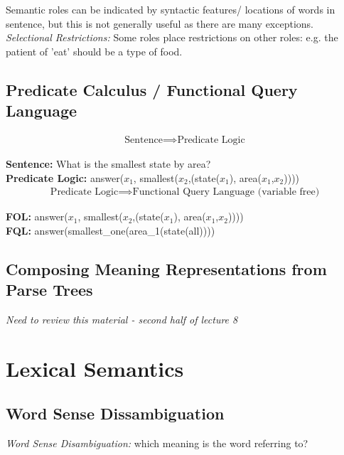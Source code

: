 \documentclass[]{article}
\begin{document}
	Semantic roles can be indicated by syntactic features/ locations of words in sentence, but this is not generally useful as there are many exceptions. \\
	
	\textit{Selectional Restrictions:} Some roles place restrictions on other roles: e.g. the patient of 'eat' should be a type of food.
	
	\subsection{Predicate Calculus / Functional Query Language}
	
	\begin{align}
	\text{Sentence} \implies \text{Predicate Logic}
	\end{align}

	\textbf{Sentence:} What is the smallest state by area? \\
	\textbf{Predicate Logic:} answer($x_1$, smallest($x_2$,(state($x_1$), area($x_1$,$x_2$)))) \\
	
	\begin{align}
		\text{Predicate Logic} \implies \text{Functional Query Language (variable free)}
	\end{align}
	
	\textbf{FOL:} answer($x_1$, smallest($x_2$,(state($x_1$), area($x_1$,$x_2$)))) \\
	\textbf{FQL:} answer(smallest\_one(area\_1(state(all)))) \\
	
	\subsection{Composing Meaning Representations from Parse Trees}
	\textit{Need to review this material - second half of lecture 8}
	
	\clearpage
	\section{Lexical Semantics}
	
	\subsection{Word Sense Dissambiguation}
	
	\textit{Word Sense Disambiguation:} which meaning is the word referring to? \\
	
\end{document}
